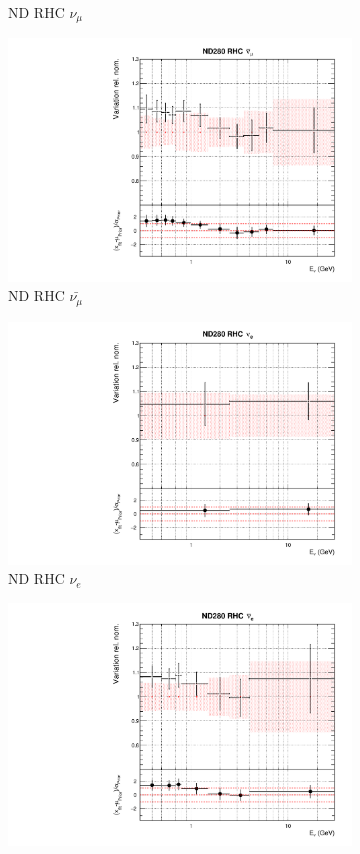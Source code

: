 \begin{figure}
\begin{subfigure}{0.24\textwidth}
  \caption{ND RHC $\nu_{\mu}$}
\end{subfigure}
\begin{subfigure}{0.24\textwidth}
  \centering
  \includegraphics[width=0.95\linewidth]{figs/datflux5}
  \caption{ND RHC $\bar{\nu_{\mu}}$}
\end{subfigure}
\begin{subfigure}{0.24\textwidth}
  \centering
  \includegraphics[width=0.95\linewidth]{figs/datflux6}
  \caption{ND RHC $\nu_{e}$}
\end{subfigure}
\vspace{15mm}
\begin{subfigure}{0.24\textwidth}
  \centering
  \includegraphics[width=0.95\linewidth]{figs/datflux7}

\end{subfigure}
\end{figure}

